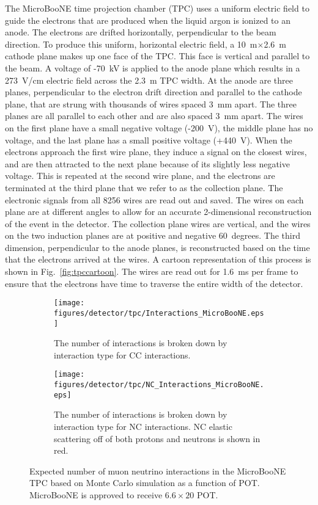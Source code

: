   The MicroBooNE time projection chamber (TPC) uses a uniform electric field
  to guide the electrons that are produced when the liquid argon is ionized
  to an anode. The electrons are drifted horizontally, perpendicular to the
  beam direction. To produce this uniform, horizontal electric field, a
  10~m$\times$2.6~m cathode plane makes up one face of the TPC. This face is
  vertical and parallel to the beam. A voltage of -70~kV is applied to the
  anode plane which results in a 273~V/cm electric field across the 2.3~m TPC
  width.  At the anode are three planes, perpendicular to the electron drift
  direction and parallel to the cathode plane, that are strung with thousands
  of wires spaced 3~mm apart.  The three planes are all parallel to each
  other and are also spaced 3~mm apart.  The wires on the first plane have a
  small negative voltage (-200~V), the middle plane has no voltage, and the
  last plane has a small positive voltage (+440~V). When the electrons
  approach the first wire plane, they induce a signal on the closest wires,
  and are then attracted to the next plane because of its slightly less
  negative voltage. This is repeated at the second wire plane, and the
  electrons are terminated at the third plane that we refer to as the
  collection plane. The electronic signals from all 8256 wires are read out
  and saved. The wires on each plane are at different angles to allow for an
  accurate 2-dimensional reconstruction of the event in the detector. The
  collection plane wires are vertical, and the wires on the two induction
  planes are at positive and negative 60~degrees. The third dimension,
  perpendicular to the anode planes, is reconstructed based on the time that
  the electrons arrived at the wires. A cartoon representation of this
  process is shown in Fig.~\ref{fig:tpccartoon}. The wires are read out for
  1.6~ms per frame to ensure that the electrons have time to traverse the
  entire width of the detector.

  \begin{figure}[h]
    \centering
    \begin{subfigure}[t]{2.5in}
      \texttt{[image: figures/detector/tpc/Interactions\_MicroBooNE.eps]}
      \caption{The number of interactions is broken down by interaction type for CC interactions.}
      \label{fig:interactionsal}
    \end{subfigure}
    \hspace{2pt}
    \begin{subfigure}[t]{2.5in}
      \texttt{[image: figures/detector/tpc/NC\_Interactions\_MicroBooNE.eps]}
      \caption{The number of interactions is broken down by interaction type
      for NC interactions. NC elastic scattering off of both protons and
      neutrons is shown in red.}
      \label{fig:interactionsnc}
    \end{subfigure}
    \caption{Expected number of muon neutrino interactions in the
    MicroBooNE TPC based on Monte Carlo simulation as a function of POT.
    MicroBooNE is approved to receive $6.6\times 20$ POT.}
    \label{fig:interactions}
  \end{figure}

